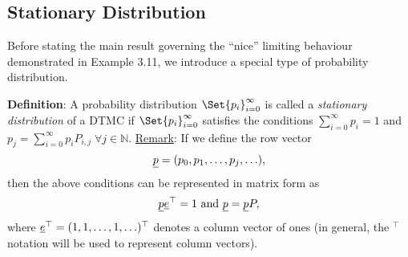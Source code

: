 \subsection*{Stationary Distribution}
Before stating the main result governing the ``nice'' limiting behaviour demonstrated in
Example 3.11, we introduce a special type of probability distribution.
\begin{Regular}
    \textbf{Definition}: A probability distribution $ \Set{p_i}_{i=0}^\infty $ is called a \emph{stationary distribution}
    of a DTMC if $ \Set{p_i}_{i=0}^\infty $ satisfies the conditions $ \sum_{i=0}^{\infty} p_i=1 $
    and $ p_j=\sum_{i=0}^{\infty} p_i P_{i,j}\; \forall j\in\mathbb{N} $.
    \tcblower{}
    \underline{Remark}: If we define the row vector
    \[ \underline{p}=(p_0,p_1,\ldots,p_j,\ldots), \]
    then the above conditions can be represented in matrix form as
    \[ \underline{p}\underline{e}^\top=1\text{ and }\underline{p}=\underline{p}P, \]
    where $ \underline{e}^\top=(1,1,\ldots,1,\ldots)^\top $ denotes a column vector of ones (in general,
    the $ {}^\top $ notation will be used to represent column vectors).
\end{Regular}
